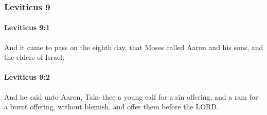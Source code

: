 	\subsubsection{Leviticus 9} %
		\label{LEVITICUS-9}

		\paragraph{Leviticus 9:1} %
			\label{LEVITICUS-9-1}

			And it came to pass on the eighth day, that Moses called Aaron and his sons, and the elders of Israel;


		\paragraph{Leviticus 9:2} %
			\label{LEVITICUS-9-2}

			And he said unto Aaron, Take thee a young calf for a sin offering, and a ram for a burnt offering, without blemish, and offer them before the LORD.

